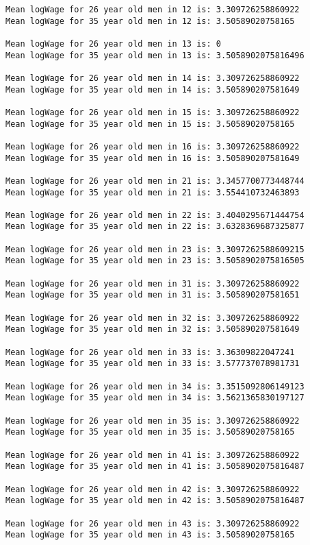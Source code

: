 \documentclass[11pt]{article}
\begin{document}
    \begin{Verbatim}[commandchars=\\\{\}]
Mean logWage for 26 year old men in 12 is: 3.309726258860922
Mean logWage for 35 year old men in 12 is: 3.50589020758165

Mean logWage for 26 year old men in 13 is: 0
Mean logWage for 35 year old men in 13 is: 3.5058902075816496

Mean logWage for 26 year old men in 14 is: 3.309726258860922
Mean logWage for 35 year old men in 14 is: 3.505890207581649

Mean logWage for 26 year old men in 15 is: 3.309726258860922
Mean logWage for 35 year old men in 15 is: 3.50589020758165

Mean logWage for 26 year old men in 16 is: 3.309726258860922
Mean logWage for 35 year old men in 16 is: 3.505890207581649

Mean logWage for 26 year old men in 21 is: 3.3457700773448744
Mean logWage for 35 year old men in 21 is: 3.554410732463893

Mean logWage for 26 year old men in 22 is: 3.4040295671444754
Mean logWage for 35 year old men in 22 is: 3.6328369687325877

Mean logWage for 26 year old men in 23 is: 3.3097262588609215
Mean logWage for 35 year old men in 23 is: 3.5058902075816505

Mean logWage for 26 year old men in 31 is: 3.309726258860922
Mean logWage for 35 year old men in 31 is: 3.505890207581651

Mean logWage for 26 year old men in 32 is: 3.309726258860922
Mean logWage for 35 year old men in 32 is: 3.505890207581649

Mean logWage for 26 year old men in 33 is: 3.36309822047241
Mean logWage for 35 year old men in 33 is: 3.577737078981731

Mean logWage for 26 year old men in 34 is: 3.3515092806149123
Mean logWage for 35 year old men in 34 is: 3.5621365830197127

Mean logWage for 26 year old men in 35 is: 3.309726258860922
Mean logWage for 35 year old men in 35 is: 3.50589020758165

Mean logWage for 26 year old men in 41 is: 3.309726258860922
Mean logWage for 35 year old men in 41 is: 3.5058902075816487

Mean logWage for 26 year old men in 42 is: 3.309726258860922
Mean logWage for 35 year old men in 42 is: 3.5058902075816487

Mean logWage for 26 year old men in 43 is: 3.309726258860922
Mean logWage for 35 year old men in 43 is: 3.50589020758165


\end{Verbatim}
\end{document}
